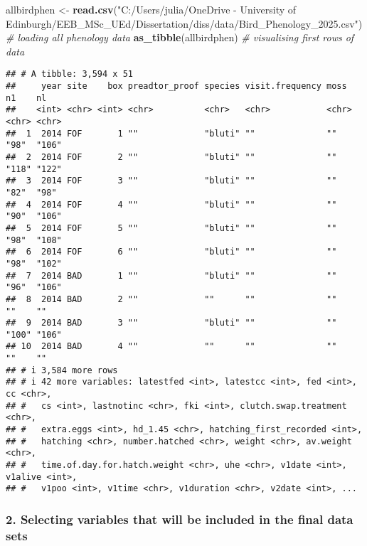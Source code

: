 \documentclass[
]{article}
\newenvironment{Shaded}{\begin{snugshade}}{\end{snugshade}}
\newcommand{\CommentTok}[1]{\textcolor[rgb]{0.56,0.35,0.01}{\textit{#1}}}
\newcommand{\FunctionTok}[1]{\textcolor[rgb]{0.13,0.29,0.53}{\textbf{#1}}}
\newcommand{\NormalTok}[1]{#1}
\newcommand{\OtherTok}[1]{\textcolor[rgb]{0.56,0.35,0.01}{#1}}
\newcommand{\StringTok}[1]{\textcolor[rgb]{0.31,0.60,0.02}{#1}}
\begin{document}
\begin{Shaded}
\begin{Highlighting}[]
\NormalTok{allbirdphen }\OtherTok{\textless{}{-}} \FunctionTok{read.csv}\NormalTok{(}\StringTok{"C:/Users/julia/OneDrive {-} University of Edinburgh/EEB\_MSc\_UEd/Dissertation/diss/data/Bird\_Phenology\_2025.csv"}\NormalTok{)  }\CommentTok{\# loading all phenology data}
\FunctionTok{as\_tibble}\NormalTok{(allbirdphen)  }\CommentTok{\# visualising first rows of data}
\end{Highlighting}
\end{Shaded}

\begin{verbatim}
## # A tibble: 3,594 x 51
##     year site    box preadtor_proof species visit.frequency moss  n1    nl   
##    <int> <chr> <int> <chr>          <chr>   <chr>           <chr> <chr> <chr>
##  1  2014 FOF       1 ""             "bluti" ""              ""    "98"  "106"
##  2  2014 FOF       2 ""             "bluti" ""              ""    "118" "122"
##  3  2014 FOF       3 ""             "bluti" ""              ""    "82"  "98" 
##  4  2014 FOF       4 ""             "bluti" ""              ""    "90"  "106"
##  5  2014 FOF       5 ""             "bluti" ""              ""    "98"  "108"
##  6  2014 FOF       6 ""             "bluti" ""              ""    "98"  "102"
##  7  2014 BAD       1 ""             "bluti" ""              ""    "96"  "106"
##  8  2014 BAD       2 ""             ""      ""              ""    ""    ""   
##  9  2014 BAD       3 ""             "bluti" ""              ""    "100" "106"
## 10  2014 BAD       4 ""             ""      ""              ""    ""    ""   
## # i 3,584 more rows
## # i 42 more variables: latestfed <int>, latestcc <int>, fed <int>, cc <chr>,
## #   cs <int>, lastnotinc <chr>, fki <int>, clutch.swap.treatment <chr>,
## #   extra.eggs <int>, hd_1.45 <chr>, hatching_first_recorded <int>,
## #   hatching <chr>, number.hatched <chr>, weight <chr>, av.weight <chr>,
## #   time.of.day.for.hatch.weight <chr>, uhe <chr>, v1date <int>, v1alive <int>,
## #   v1poo <int>, v1time <chr>, v1duration <chr>, v2date <int>, ...
\end{verbatim}

\subsubsection{2. Selecting variables that will be included in the final
data
sets}\label{selecting-variables-that-will-be-included-in-the-final-data-sets}
\end{document}

